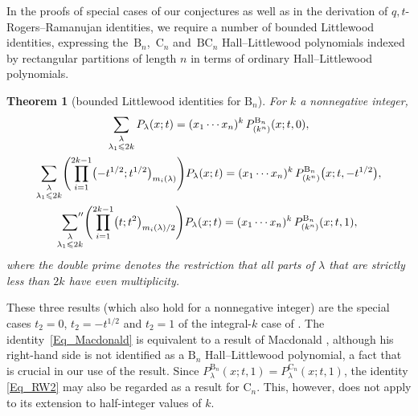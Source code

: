 \documentclass[pdftex]{sigma}
\numberwithin{equation}{section}
\newtheorem{Theorem}{Theorem}[section]
\renewcommand{\leq}{\leqslant}
\newcommand{\la}{\lambda}
\begin{document}
In the proofs of special cases of our conjectures as well as in the
derivation of $q,t$-Ro\-gers--Ramanujan identities, we require a number
of bounded Littlewood identities, expressing the~$\mathrm{B}_n$,~$\mathrm{C}_n$
and~$\mathrm{BC}_n$ Hall--Littlewood polynomials indexed
by rectangular partitions of length $n$ in terms of ordinary
Hall--Littlewood polynomials.

\begin{Theorem}[bounded Littlewood identities for $\mathrm{B}_n$]
For $k$ a nonnegative integer,
\begin{subequations}
\begin{gather}\label{Eq_Macdonald}
\sum_{\substack{\la \\[1pt] \la_1\leq 2k}}
P_{\la}(x;t)=(x_1\cdots x_n)^k\,P_{(k^n)}^{\mathrm{B}_n}(x;t,0), \\
\label{Eq_RW1}
\sum_{\substack{\la \\[1pt] \la_1\leq 2k}}
\Biggl(\prod_{i=1}^{2k-1}\bigl({-}t^{1/2};t^{1/2}\bigr)_{m_i(\la)}\Biggr)
P_{\la}(x;t)=(x_1\cdots x_n)^k\,
P_{(k^n)}^{\mathrm{B}_n}\bigl(x;t,-t^{1/2}\bigr), \\
\label{Eq_RW2}
\sideset{}{''}\sum_{\substack{\la \\[1pt] \la_1\leq 2k}}
\Biggl(\prod_{i=1}^{2k-1}\bigl(t;t^2\bigr)_{m_i(\la)/2}\Biggr)
P_{\la}(x;t)=(x_1\cdots x_n)^k\,P_{(k^n)}^{\mathrm{B}_n}(x;t,1),
\end{gather}
\end{subequations}
where the double prime denotes the restriction that all parts of $\la$ that
are strictly less than $2k$ have even multiplicity.
\end{Theorem}

These three results (which also hold for  a nonnegative
integer) are the special cases $t_2=0$, $t_2=-t^{1/2}$ and $t_2=1$
of the integral-$k$ case of \cite[Theorem~4.8]{RW21}.
The identity~\eqref{Eq_Macdonald} is equivalent to a result of
Macdonald \cite[pp.~232--233]{Macdonald95}, although his right-hand
side is not identified as a $\mathrm{B}_n$ Hall--Littlewood polynomial,
a fact that is crucial in our use of the result.
Since $P_{\la}^{\mathrm{B}_n}(x;t,1)=P_{\la}^{\mathrm{C}_n}(x;t,1)$,
the identity \eqref{Eq_RW2} may also be regarded as a result for
$\mathrm{C}_n$.
This, however, does not apply to its extension to half-integer
values of $k$.
\end{document}
